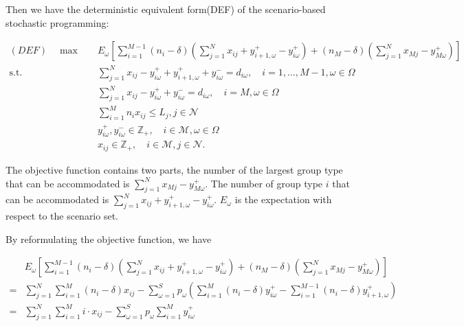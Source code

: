 

Then we have the deterministic equivalent form(DEF) of the scenario-based stochastic programming:

    \begin{align}
    (DEF) \quad \max \quad & E_{\omega}\left[\sum_{i=1}^{M-1} (n_i-\delta) (\sum_{j= 1}^{N} x_{ij} + y_{i+1,\omega}^{+} - y_{i \omega}^{+}) + (n_{M}-\delta) (\sum_{j= 1}^{N} x_{Mj} - y_{M \omega}^{+})\right] \\
    \text {s.t.} \quad & \sum_{j= 1}^{N} x_{ij}-y_{i \omega}^{+}+
    y_{i+1, \omega}^{+} + y_{i \omega}^{-}=d_{i \omega}, \quad i = 1,\ldots, M-1, \omega \in \Omega \label{DEF_constr1} \\
    & \sum_{j= 1}^{N} x_{ij} -y_{i \omega}^{+}+y_{i \omega}^{-}=d_{i \omega}, \quad i = M, \omega \in \Omega \label{DEF_constr2}\\
    & \sum_{i=1}^{M} n_{i} x_{ij} \leq L_j, j \in \mathcal{N}  \label{DEF_constr3} \\
    & y_{i \omega}^{+}, y_{i \omega}^{-} \in \mathbb{Z}_{+}, \quad i \in \mathcal{M}, \omega \in \Omega \\
    & x_{ij} \in \mathbb{Z}_{+}, \quad i \in \mathcal{M}, j \in \mathcal{N}.
    \end{align}

The objective function contains two parts, the number of the largest group type that can be accommodated is $\sum_{j= 1}^{N} x_{Mj} - y_{M \omega}^{+}$. The number of group type $i$ that can be accommodated is $\sum_{j= 1}^{N} x_{ij} + y_{i+1,\omega}^{+} - y_{i \omega}^{+}$. $E_{\omega}$ is the expectation with respect to the scenario set.

By reformulating the objective function, we have

\begin{align*}
  & E_{\omega}\left[\sum_{i=1}^{M-1} (n_i-\delta) (\sum_{j= 1}^{N} x_{ij} + y_{i+1,\omega}^{+} - y_{i \omega}^{+}) + (n_M-\delta) (\sum_{j= 1}^{N} x_{Mj} - y_{M \omega}^{+})\right] \\
  =& \sum_{j =1}^{N} \sum_{i=1}^M (n_i- \delta) x_{ij} - \sum_{\omega =1}^{S} p_{\omega} \left(\sum_{i=1}^{M}(n_i- \delta)y_{i \omega}^{+} - \sum_{i=1}^{M-1}(n_i-\delta)y_{i+1, \omega}^{+}\right) \\
  =& \sum_{j =1}^{N} \sum_{i=1}^M i \cdot x_{ij} - \sum_{\omega =1}^{S} p_{\omega} \sum_{i = 1}^{M} y_{i \omega}^{+}
\end{align*}


